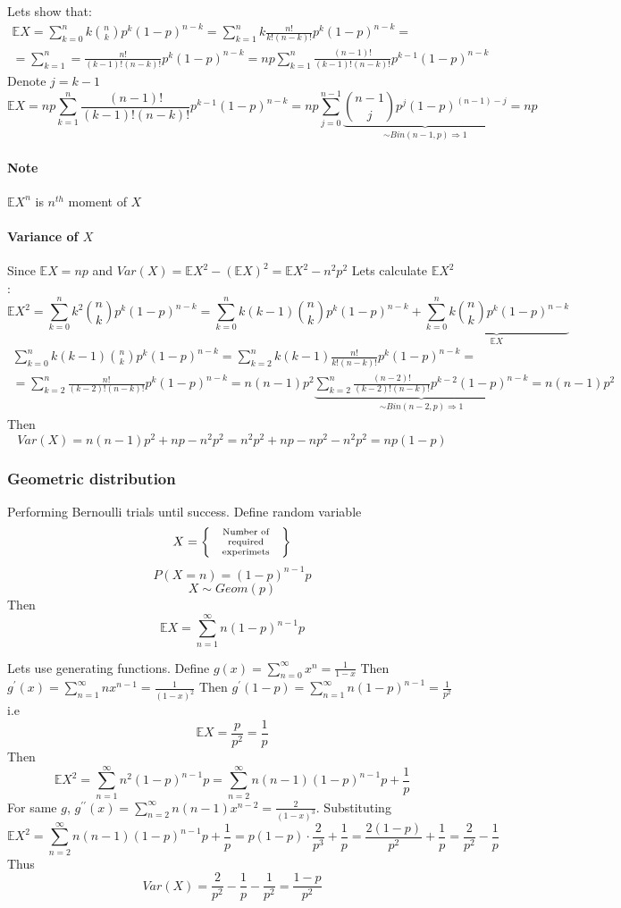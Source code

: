 Lets show that:
\begin{align*}
\mathbb{E}X = \sum_{k=0}^n k \binom{n}{k} p^k (1-p)^{n-k} = \sum_{k=1}^n k \frac{n!}{k!(n-k)!} p^k (1-p)^{n-k} =\\= \sum_{k=1}^n = \frac{n!}{(k-1)!(n-k)!} p^k (1-p)^{n-k} = np \sum_{k=1}^n \frac{(n-1)!}{(k-1)!(n-k)!} p^{k-1 }(1-p)^{n-k}
\end{align*}
Denote $j = k-1$
$$\mathbb{E}X= np \sum_{k=1}^n \frac{(n-1)!}{(k-1)!(n-k)!} p^{k-1 }(1-p)^{n-k} = np \sum_{j=0}^{n-1} \underbrace{\binom{n-1}{j}p^{j}(1-p)^{(n-1)-j}}_{\sim Bin(n-1,p) \Rightarrow 1} = np $$

\paragraph{Note} $\mathbb{E}X^n$ is $n^{th}$ moment of $X$
\paragraph{Variance of $X$}
Since $\mathbb{E}X = np$ and $Var(X) = \mathbb{E}X^2 - (\mathbb{E}X)^2 = \mathbb{E}X^2 - n^2p^2$
Lets calculate $\mathbb{E}X^2$:
$$\mathbb{E}X^2 = \sum_{k=0}^n k^2 \binom{n}{k} p^k (1-p)^{n-k} = \sum_{k=0}^n k(k-1) \binom{n}{k} p^k (1-p)^{n-k} + \underbrace{\sum_{k=0}^n k \binom{n}{k} p^k (1-p)^{n-k}}_{\mathbb{E}X}$$
\begin{align*}
\sum_{k=0}^n k(k-1) \binom{n}{k} p^k (1-p)^{n-k} =  \sum_{k=2}^n k(k-1) \frac{n!}{k!(n-k)!} p^k (1-p)^{n-k} =\\= \sum_{k=2}^n \frac{n!}{(k-2)!(n-k)!} p^k (1-p)^{n-k}  = n(n-1)p^2 \underbrace{\sum_{k=2}^n \frac{(n-2)!}{(k-2)!(n-k)!} p^{k-2 }(1-p)^{n-k}}_{\sim Bin(n-2,p) \Rightarrow 1} =  n(n-1)p^2 
\end{align*}
Then
$$Var(X) = n(n-1)p^2  + np - n^2p^2 = n^2p^2 +np- np^2 -n^2p^2 = np(1-p)$$


\subsubsection{Geometric distribution}
Performing Bernoulli trials until success. Define random variable
$$X = \left\{ \parbox{2cm}{\scriptsize \centering Number of required experimets} \right\}$$
$$P(X=n) = (1-p)^{n-1} p $$
$$X \sim Geom(p)$$
Then
$$\mathbb{E}X = \sum_{n=1}^\infty n(1-p)^{n-1}p $$

Lets use generating functions. Define $g(x) = \sum_{n=0}^\infty x^n = \frac{1}{1-x}$
Then $g^\prime(x) = \sum_{n=1}^\infty nx^{n-1} = \frac{1}{(1-x)^2}$
Then $g^\prime(1-p) = \sum_{n=1}^\infty n(1-p)^{n-1} = \frac{1}{p^2}$
i.e
$$\mathbb{E}X = \frac{p}{p^2} = \frac{1}{p}$$
Then
$$\mathbb{E}X^2 = \sum_{n=1}^\infty n^2(1-p)^{n-1}p = \sum_{n=2}^\infty n(n-1)(1-p)^{n-1}p+\frac{1}{p}$$
For same $g$, $g^{\prime\prime}(x) = \sum_{n=2}^\infty n(n-1)x^{n-2} = \frac{2}{(1-x)^3}$.
Substituting
$$\mathbb{E}X^2 = \sum_{n=2}^\infty n(n-1)(1-p)^{n-1}p+\frac{1}{p} = p(1-p) \cdot \frac{2}{p^3} + \frac{1}{p} =  \frac{2(1-p) }{p^2} + \frac{1}{p} = \frac{2}{p^2} - \frac{1}{p}$$
Thus
$$Var(X) = \frac{2}{p^2} - \frac{1}{p} - \frac{1}{p^2} = \frac{1-p}{p^2}$$

